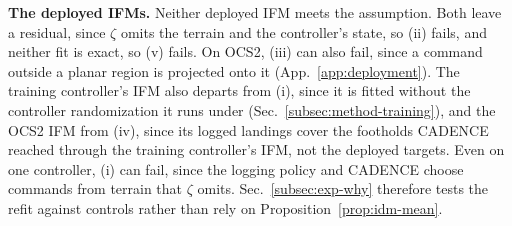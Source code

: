 \noindent\textbf{The deployed IFMs.}
 Neither deployed IFM meets the assumption. Both leave a
residual, since $\zeta$ omits the terrain and the controller's state, so
(ii) fails, and neither fit is exact, so (v) fails. On OCS2, (iii) can
also fail, since a command outside a planar region is projected onto
it (App.~\ref{app:deployment}). The training
controller's IFM also departs from (i), since it is fitted without the
controller randomization it runs under
(Sec.~\ref{subsec:method-training}), and the OCS2 IFM from (iv), since
its logged landings cover the footholds CADENCE reached through the
training controller's IFM, not the deployed targets. Even on one
controller, (i) can fail, since the logging policy and
CADENCE choose commands from terrain that $\zeta$ omits.
Sec.~\ref{subsec:exp-why} therefore tests the refit against controls
rather than rely on Proposition~\ref{prop:idm-mean}.
